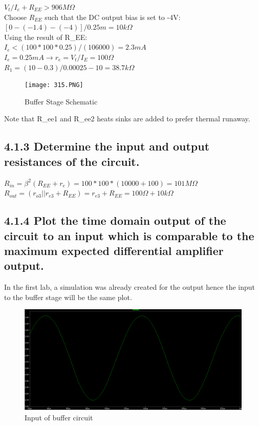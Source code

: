 \documentclass[12pt]{article}
\begin{document}
$V_t / I_e + R_{EE} > 906 M \Omega$ \\

Choose $R_{EE}$ such that the DC output bias is set to -4V: \\

$[0 - (-1.4) - (-4)] / 0.25m = 10k \Omega$ \\ 

Using the result of R_{EE}: \\

$I_e < (100 * 100 * 0.25) / (106 000) = 2.3mA$ \\

$I_e = 0.25mA \rightarrow r_e = V_t / I_E = 100 \Omega$ \\

$R_1 = (10 - 0.3) / 0.00025 - 10 = 38.7k \Omega$

\begin{figure}[H]
    \centering
    \texttt{[image: 315.PNG]}
    \caption{Buffer Stage Schematic}
\end{figure}

Note that R_{ee1} and R_{ee2} heats sinks are added to prefer thermal runaway.
    

\subsection*{4.1.3 Determine the input and output resistances of the circuit.}

$R_{in} = \beta^2 (R_{EE} + r_e) = 100 * 100 * (10000 + 100) = 101M \Omega$ \\

$R_{out} = ( r_{o3} || r_{e3} + R_{EE} ) = r_{e3} + R_{EE} = 100 \Omega + 10k \Omega$

\subsection*{4.1.4 Plot the time domain output of the circuit to an input which is comparable to the maximum expected differential amplifier output.}

In the first lab, a simulation was already created for the output hence the input to the buffer stage will be the same plot.

\begin{figure}[H]
\centering
\includegraphics[width=1.0\textwidth]{414.png}
\caption{Input of buffer circuit}
\end{figure}
\end{document}
